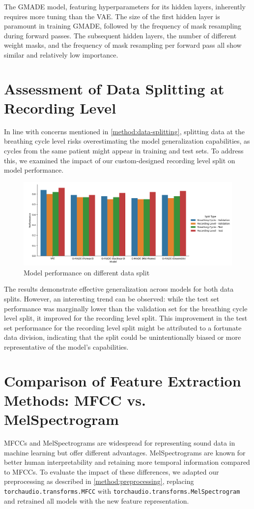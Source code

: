 The GMADE model, featuring hyperparameters for its hidden layers, inherently requires more tuning than the VAE. The size of the first hidden layer is paramount in training GMADE, followed by the frequency of mask resampling during forward passes. The subsequent hidden layers, the number of different weight masks, and the frequency of mask resampling per forward pass all show similar and relatively low importance.

\section{Assessment of Data Splitting at Recording Level}
In line with concerns mentioned in \autoref{method:data-splitting}, splitting data at the breathing cycle level risks overestimating the model generalization capabilities, as cycles from the same patient might appear in training and test sets. To address this, we examined the impact of our custom-designed recording level split on model performance.

\begin{figure}[h!]
    \includegraphics[width=\linewidth]{images/split_performance}
    \caption{
    Model performance on different data split
}
\end{figure}

The results demonstrate effective generalization across models for both data splits. However, an interesting trend can be observed: while the test set performance was marginally lower than the validation set for the breathing cycle level split, it improved for the recording level split. This improvement in the test set performance for the recording level split might be attributed to a fortunate data division, indicating that the split could be unintentionally biased or more representative of the model's capabilities.

\section{Comparison of Feature Extraction Methods: MFCC vs. MelSpectrogram}
MFCCs and MelSpectrograms are widespread for representing sound data in machine learning but offer different advantages. MelSpectrograms are known for better human interpretability and retaining more temporal information compared to MFCCs. To evaluate the impact of these differences, we adapted our preprocessing as described in \autoref{method:preprocessing}, replacing \lstinline{torchaudio.transforms.MFCC} with \lstinline{torchaudio.transforms.MelSpectrogram} and retrained all models with the new feature representation.

